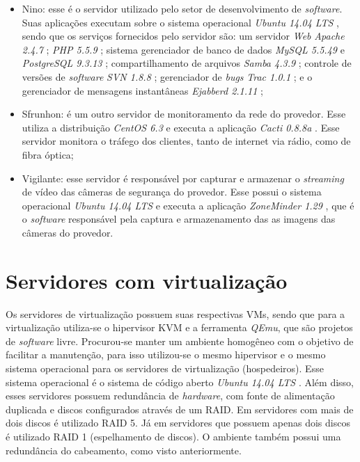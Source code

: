 \begin{itemize}
 \item Nino: esse é o servidor utilizado pelo setor de desenvolvimento de \textit{software}. Suas aplicações executam sobre o sistema operacional 
 \textit{Ubuntu 14.04 \ac{LTS}} \cite{ubuntu}, sendo que os serviços fornecidos pelo servidor são: um servidor \textit{Web} \textit{Apache 2.4.7} 
 \cite{apache}; \textit{\ac{PHP} 5.5.9} \cite{php}; sistema gerenciador de banco de dados \textit{MySQL 5.5.49} \cite{mysql} e 
 \textit{PostgreSQL 9.3.13} \cite{postgres}; compartilhamento de arquivos \textit{Samba 4.3.9} \cite{samba}; controle de versões de 
 \textit{software} \textit{\ac{SVN} 1.8.8} \cite{svn}; gerenciador de \textit{bugs} \textit{Trac 1.0.1} \cite{trac}; e o gerenciador de 
 mensagens instantâneas \textit{Ejabberd 2.1.11} \cite{ejabberd};
 
 \item Sfrunhon: é um outro servidor de monitoramento da rede do provedor. Esse utiliza a distribuição \textit{CentOS 6.3} \cite{centos} e executa 
 a aplicação \textit{Cacti 0.8.8a} \cite{cacti}. Esse servidor monitora o tráfego dos clientes, tanto de internet via rádio, como de 
 fibra óptica;
 
 \item Vigilante: esse servidor é responsável por capturar e armazenar o \textit{streaming} de vídeo das câmeras de segurança do provedor. 
 Esse possui o sistema operacional \textit{Ubuntu 14.04 \ac{LTS}} \cite{ubuntu} e executa a aplicação \textit{ZoneMinder 1.29} \cite{zoneminder}, 
 que é o \textit{software} responsável pela captura e armazenamento das as imagens das câmeras do provedor.
\end{itemize}

\section{Servidores com virtualização}
\label{section:servvirt}

Os servidores de virtualização possuem suas respectivas \ac{VM}s, sendo que para a virtualização utiliza-se o hipervisor \ac{KVM} e a 
ferramenta \textit{QEmu}, que são projetos de \textit{software} livre. Procurou-se manter um ambiente homogêneo com o objetivo de facilitar a 
manutenção, para isso utilizou-se o mesmo hipervisor e o mesmo sistema operacional para os servidores de virtualização (hospedeiros). 
Esse sistema operacional é o sistema de código aberto \textit{Ubuntu 14.04 \ac{LTS}} \cite{ubuntu}.
Além disso, esses servidores possuem redundância de \textit{hardware}, com fonte de alimentação duplicada e discos configurados através de um 
\ac{RAID}. Em servidores com mais de dois discos é utilizado \ac{RAID} 5. Já em servidores que possuem apenas dois discos é utilizado \ac{RAID} 1 
(espelhamento de discos). O ambiente também possui uma redundância do cabeamento, como visto anteriormente.

